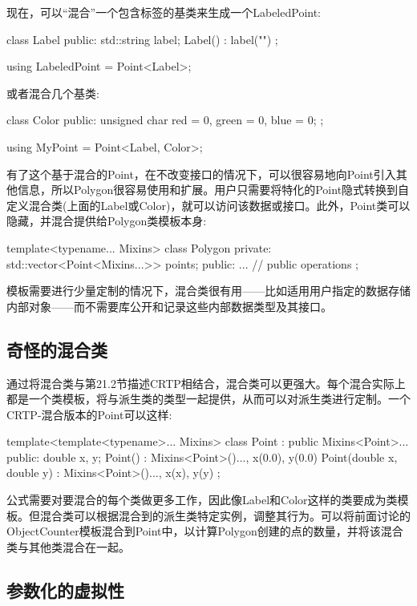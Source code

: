 现在，可以“混合”一个包含标签的基类来生成一个LabeledPoint:

\begin{cpp}
class Label
{
	public:
	std::string label;
	Label() : label("") { }
};

using LabeledPoint = Point<Label>;
\end{cpp}

或者混合几个基类:

\begin{cpp}
class Color
{
	public:
	unsigned char red = 0, green = 0, blue = 0;
};

using MyPoint = Point<Label, Color>;
\end{cpp}

有了这个基于混合的Point，在不改变接口的情况下，可以很容易地向Point引入其他信息，所以Polygon很容易使用和扩展。用户只需要将特化的Point隐式转换到自定义混合类(上面的Label或Color)，就可以访问该数据或接口。此外，Point类可以隐藏，并混合提供给Polygon类模板本身:

\begin{cpp}
template<typename... Mixins>
class Polygon
{
	private:
	std::vector<Point<Mixins...>> points;
	public:
	... // public operations
};
\end{cpp}

模板需要进行少量定制的情况下，混合类很有用——比如适用用户指定的数据存储内部对象——而不需要库公开和记录这些内部数据类型及其接口。

\subsection{奇怪的混合类}

通过将混合类与第21.2节描述CRTP相结合，混合类可以更强大。每个混合实际上都是一个类模板，将与派生类的类型一起提供，从而可以对派生类进行定制。一个CRTP-混合版本的Point可以这样:

\begin{cpp}
template<template<typename>... Mixins>
class Point : public Mixins<Point>...
{
	public:
	double x, y;
	Point() : Mixins<Point>()..., x(0.0), y(0.0) { }
	Point(double x, double y) : Mixins<Point>()..., x(x), y(y) { }
};
\end{cpp}

公式需要对要混合的每个类做更多工作，因此像Label和Color这样的类要成为类模板。但混合类可以根据混合到的派生类特定实例，调整其行为。可以将前面讨论的ObjectCounter模板混合到Point中，以计算Polygon创建的点的数量，并将该混合类与其他类混合在一起。

\subsection{参数化的虚拟性}

